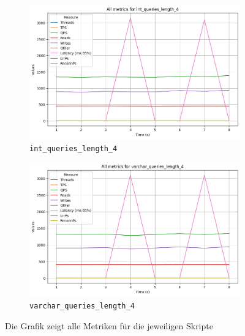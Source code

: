 \vspace{-5pt}
\begin{figure}[H]
    \centering
    \begin{subfigure}[t]{0.48\textwidth}
        \centering
        \includegraphics[width=\textwidth]{PNGs/Join_Type/int_queries_length_4}
        \caption{\texttt{int\_queries\_length\_4}}
        \label{join-typ-int_queries}
    \end{subfigure}
    \hfill
    \begin{subfigure}[t]{0.48\textwidth}
        \centering
        \includegraphics[width=\textwidth]{PNGs/Join_Type/varchar_queries_length_4}
        \caption{\texttt{varchar\_queries\_length\_4}}
        \label{join-typ-varchar_queries_length_4}
    \end{subfigure}
    \caption[Join-Typ: Skriptvergleich]{Die Grafik zeigt alle Metriken für die jeweiligen Skripte}
    \label{fig:join-typ-comp-script}
\end{figure}
\vspace{-20pt}

